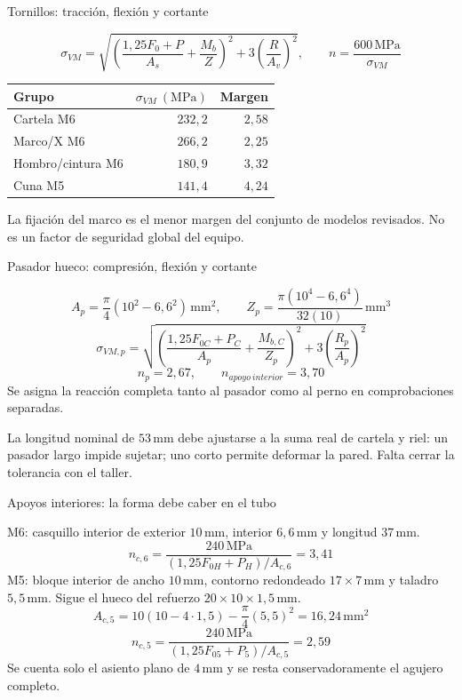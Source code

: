 \documentclass[10pt,aspectratio=169]{beamer}
\newcommand{\mm}{\,\mathrm{mm}}
\newcommand{\MPa}{\,\mathrm{MPa}}
\newcommand{\mcref}{Guía de diseño}
\begin{document}
\gdef\mcref{Mathcad: sección 20 / pág. 34-35}
\begin{frame}[t]{Tornillos: tracción, flexión y cortante}

\[
\sigma_{VM}=\sqrt{\left(\frac{1{,}25F_0+P}{A_s}+\frac{M_b}{Z}\right)^2
+3\left(\frac{R}{A_v}\right)^2},\qquad n=\frac{600\MPa}{\sigma_{VM}}
\]
\begin{center}\begin{tabular}{lrr}\toprule
Grupo & $\sigma_{VM}\ (\mathrm{MPa})$ & Margen\\\midrule
Cartela M6 & $232{,}2$ & $2{,}58$\\
Marco/X M6 & $266{,}2$ & $2{,}25$\\
Hombro/cintura M6 & $180{,}9$ & $3{,}32$\\
Cuna M5 & $141{,}4$ & $4{,}24$\\\bottomrule\end{tabular}\end{center}
La fijación del marco es el menor margen del conjunto de modelos revisados. No es un factor de seguridad global del equipo.

\end{frame}

\gdef\mcref{Mathcad: sección 21 / pág. 36}
\begin{frame}[t]{Pasador hueco: compresión, flexión y cortante}

\[
A_p=\frac\pi4(10^2-6{,}6^2)\,\mathrm{mm^2},\qquad
Z_p=\frac{\pi(10^4-6{,}6^4)}{32(10)}\,\mathrm{mm^3}
\]
\[
\sigma_{VM,p}=\sqrt{\left(\frac{1{,}25F_{0C}+P_C}{A_p}+\frac{M_{b,C}}{Z_p}\right)^2
+3\left(\frac{R_p}{A_p}\right)^2}
\]
\[
n_p=2{,}67,\qquad n_{apoyo\ interior}=3{,}70
\]
Se asigna la reacción completa tanto al pasador como al perno en comprobaciones separadas.

La longitud nominal de $53\mm$ debe ajustarse a la suma real de cartela y riel: un pasador largo impide sujetar; uno corto permite deformar la pared. Falta cerrar la tolerancia con el taller.

\end{frame}

\gdef\mcref{Mathcad: sección 22 / pág. 37-38}
\begin{frame}[t]{Apoyos interiores: la forma debe caber en el tubo}

M6: casquillo interior de exterior $10\mm$, interior $6{,}6\mm$ y longitud $37\mm$.
\[
n_{c,6}=\frac{240\MPa}{(1{,}25F_{0H}+P_H)/A_{c,6}}=3{,}41
\]
M5: bloque interior de ancho $10\mm$, contorno redondeado $17\times7\mm$ y taladro $5{,}5\mm$. Sigue el hueco del refuerzo $20\times10\times1{,}5\mm$.
\[
A_{c,5}=10(10-4\cdot1{,}5)-\frac\pi4(5{,}5)^2
=16{,}24\,\mathrm{mm^2}
\]
\[
n_{c,5}=\frac{240\MPa}{(1{,}25F_{05}+P_5)/A_{c,5}}=2{,}59
\]
Se cuenta solo el asiento plano de $4\mm$ y se resta conservadoramente el agujero completo.

\end{frame}
\end{document}
